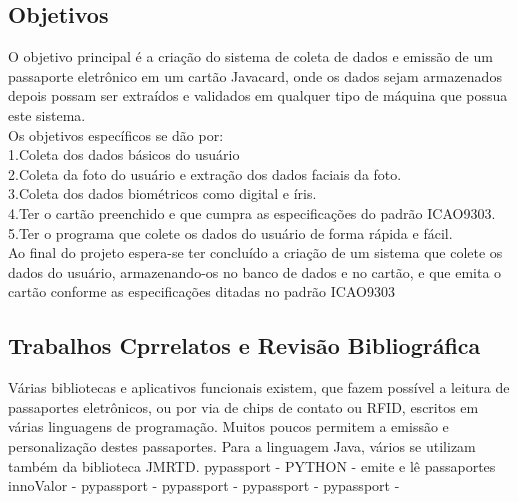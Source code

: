 \documentclass{article}
\begin{document}
	\subsection{Objetivos}
		\begin{justify}
				
				\hspace{2cm}O objetivo principal é a criação do sistema de coleta de dados e emissão de um passaporte eletrônico em um cartão Javacard, onde os dados sejam armazenados depois possam ser extraídos e validados em qualquer tipo de máquina que possua este sistema.\\
				\hspace*{2cm}Os objetivos específicos se dão por:\\
					\hspace*{3cm}1.Coleta dos dados básicos do usuário\\
					\hspace*{3cm}2.Coleta da foto do usuário e extração dos dados faciais da foto.\\
					\hspace*{3cm}3.Coleta dos dados biométricos como digital e íris.\\
					\hspace*{3cm}4.Ter o cartão preenchido e que cumpra as especificações do padrão ICAO9303.\\
					\hspace*{3cm}5.Ter o programa que colete os dados do usuário de forma rápida e fácil.\\
				 \hspace*{2cm}Ao final do projeto espera-se ter concluído a criação de um sistema que colete os dados do usuário, armazenando-os no banco de dados e no cartão, e que emita o cartão conforme as especificações ditadas no padrão ICAO9303

			
		\end{justify}

	\subsection{Trabalhos Cprrelatos e Revisão Bibliográfica}
		\begin{justify}
			\hspace{2cm} Várias bibliotecas e aplicativos funcionais existem, que fazem possível a leitura de passaportes eletrônicos, ou por via de chips de contato ou RFID, escritos em várias linguagens de programação. Muitos poucos permitem a emissão e personalização destes passaportes. Para a linguagem Java, vários se utilizam também da biblioteca JMRTD.
			\hspace*{2cm}pypassport - PYTHON - emite e lê passaportes\cite{PYPASSPORT}
			\hspace*{2cm}innoValor - \cite{PYPASSPORT}
			\hspace*{2cm}pypassport - \cite{PYPASSPORT}
			\hspace*{2cm}pypassport - \cite{PYPASSPORT}
			\hspace*{2cm}pypassport - \cite{PYPASSPORT}
			\hspace*{2cm}pypassport - \cite{PYPASSPORT}


		\end{justify}
\end{document}
